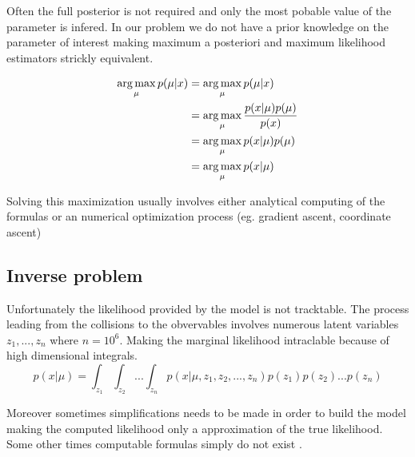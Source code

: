 Often the full posterior is not required and only the most pobable value of the parameter is infered.
In our problem we do not have a prior knowledge on the parameter of interest making maximum a posteriori and maximum likelihood estimators strickly equivalent.

\begin{align}
	\operatorname*{arg\,max}_\mu p(\mu | x) &= \operatorname*{arg\,max}_\mu p(\mu | x) \\
							&= \operatorname*{arg\,max}_\mu \frac{p(x|\mu) p(\mu)}{p(x)} \\
							&= \operatorname*{arg\,max}_\mu p(x|\mu) p(\mu) \\
							&= \operatorname*{arg\,max}_\mu p(x|\mu)\\
\end{align}

Solving this maximization usually involves either analytical computing of the formulas  or an numerical optimization process (eg. gradient ascent, coordinate ascent)






\subsection{Inverse problem} %
\label{sub:inverse_problem}


Unfortunately the likelihood provided by the model is not tracktable.
The process leading from the collisions to the obvervables involves numerous latent variables $z_1, ..., z_n$ where $n=10^6$.
Making the marginal likelihood intraclable because of high dimensional integrals.
\begin{equation}
	\label{eq:intractable_integral}
	p(x|\mu) = \int_{z_1} \int_{z_2} ... \int_{z_n} p(x|\mu, z_1, z_2, ..., z_n) p(z_1) p(z_2) ... p(z_n)
\end{equation}


Moreover sometimes simplifications needs to be made in order to build the model \needcite making the computed likelihood only a approximation of the true likelihood.
Some other times computable formulas simply do not exist \needcite.



